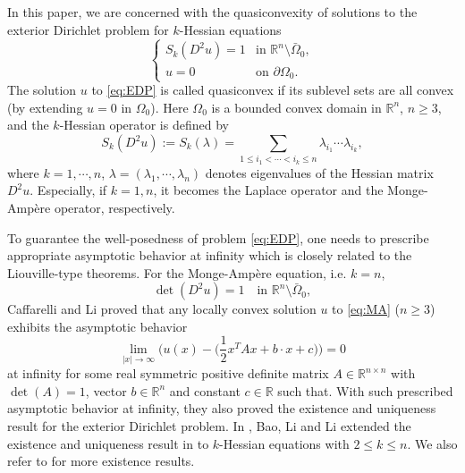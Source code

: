 \documentclass[reqno]{amsart}
\theoremstyle{remark}
\theoremstyle{definition}
\numberwithin{equation}{section}
\begin{document}
In this paper, we are concerned with the quasiconvexity of solutions to the exterior Dirichlet problem for $k$-Hessian equations
\begin{equation}\label{eq:EDP}
	\begin{cases}
		S_k(D^2u)=1  & \text{in }\mathbb{R}^n\setminus\bar\Omega_0, \\
		u=0  & \text{on }\partial\Omega_0.
	    \end{cases}
\end{equation}
The solution $u$ to \eqref{eq:EDP} is called quasiconvex if its sublevel sets are all convex (by extending $u=0$ in $\Omega_0$).
Here $\Omega_0$ is a bounded convex domain in $\mathbb{R}^n$, $n\geq3$, and the $k$-Hessian operator is defined by
$$S_k(D^2u):=S_k(\lambda)=\sum_{1\leq i_1<\cdots<i_k\leq n}\lambda_{i_1}\cdots\lambda_{i_k},$$
where $k=1, \cdots, n$, $\lambda=(\lambda_1,\cdots,\lambda_n)$ denotes eigenvalues of the Hessian matrix $D^2u$. Especially, if $k=1,n$, it becomes the Laplace operator and the Monge-Amp\`{e}re operator, respectively. 

To guarantee the well-posedness of problem \eqref{eq:EDP}, one needs to prescribe appropriate asymptotic behavior at infinity which is closely related to the Liouville-type theorems. For the Monge-Amp\`ere equation, i.e. $k=n$,
\begin{equation}\label{eq:MA}
	\det(D^2u)=1\quad\text{in }\mathbb{R}^n\setminus\bar{\Omega}_0,
\end{equation}
Caffarelli and Li \cite{Caffarelli-Li-2003} proved that any locally convex solution $u$ to \eqref{eq:MA} ($n\geq3$) exhibits the asymptotic behavior 
\begin{equation}\label{eq:asy}
	\lim_{|x|\to\infty}\bigg(u(x)-\bigg(\frac{1}{2}x^TAx+b\cdot x+c\bigg)\bigg)=0
\end{equation}
at infinity for some real symmetric positive definite matrix $A\in \mathbb{R}^{n\times n}$ with $\det(A)=1$, vector $b \in \mathbb{R}^n$ and constant $c \in \mathbb{R}$ such that. With such prescribed asymptotic behavior at infinity, they also proved the existence and uniqueness result for the exterior Dirichlet problem. In \cite{Bao-Li-Li}, Bao, Li and Li extended the existence and uniqueness result in \cite{Caffarelli-Li-2003} to $k$-Hessian equations with $2\leq k\leq n$. We also refer to \cite{Bao-Wang-2024, Li-Lu, Li-Xiao, Ma-Zhang,Wang-Wang} for more existence results. 
\end{document}
